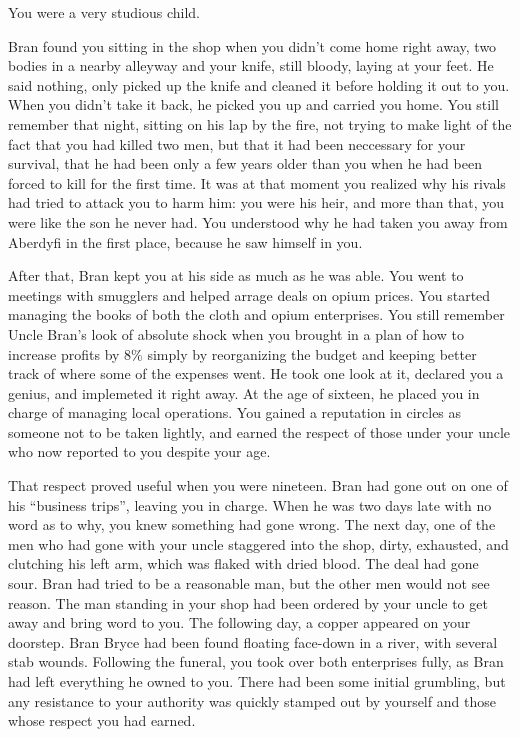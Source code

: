 \documentclass[char]{airship}
\begin{document}
You were a very studious child.

Bran found you sitting in the shop when you didn't come home right
away, two bodies in a nearby alleyway and your knife, still bloody,
laying at your feet.  He said nothing, only picked up the knife and
cleaned it before holding it out to you.  When you didn't take it
back, he picked you up and carried you home.  You still remember that
night, sitting on his lap by the fire, not trying to make light of the
fact that you had killed two men, but that it had been neccessary for
your survival, that he had been only a few years older than you when
he had been forced to kill for the first time.  It was at that moment
you realized why his rivals had tried to attack you to harm him: you
were his heir, and more than that, you were like the son he never had.
You understood why he had taken you away from Aberdyfi in the first
place, because he saw himself in you.

After that, Bran kept you at his side as much as he was able.  You went to meetings with smugglers and helped arrage deals on opium prices.  You started managing the books of both the cloth and opium enterprises.  You still remember Uncle Bran's look of absolute shock when you brought in a plan of how to increase profits by 8\% simply by reorganizing the budget and keeping better track of where some of the expenses went.  He took one look at it, declared you a genius, and implemeted it right away.  At the age of sixteen, he placed you in charge of managing local operations.  You gained a reputation in circles as someone not to be taken lightly, and earned the respect of those under your uncle who now reported to you despite your age.

That respect proved useful when you were nineteen.  Bran had gone out on one of his ``business trips'', leaving you in charge.  When he was two days late with no word as to why, you knew something had gone wrong.  The next day, one of the men who had gone with your uncle staggered into the shop, dirty, exhausted, and clutching his left arm, which was flaked with dried blood.   The deal had gone sour.  Bran had tried to be a reasonable man, but the other men would not see reason.  The man standing in your shop had been ordered by your uncle to get away and bring word to you.  The following day, a copper appeared on your doorstep.  Bran Bryce had been found floating face-down in a river, with several stab wounds.  Following the funeral, you took over both enterprises fully, as Bran had left everything he owned to you.  There had been some initial grumbling, but any resistance to your authority was quickly stamped out by yourself and those whose respect you had earned.
\end{document}
